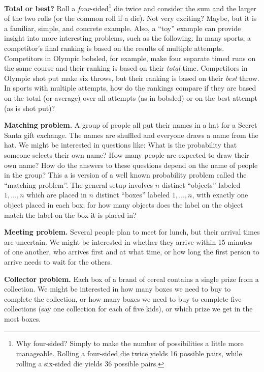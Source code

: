 \documentclass[
  letterpaper,
  DIV=11,
  numbers=noendperiod]{scrreprt}
\theoremstyle{plain}
\theoremstyle{definition}
\theoremstyle{definition}
\theoremstyle{definition}
\theoremstyle{remark}
\begin{document}
\textbf{Total or best?} Roll a \emph{four}-sided\footnote{Why
  four-sided? Simply to make the number of possibilities a little more
  manageable. Rolling a four-sided die twice yields 16 possible pairs,
  while rolling a six-sided die yields 36 possible pairs.} die twice and
consider the sum and the larger of the two rolls (or the common roll if
a die). Not very exciting? Maybe, but it is a familiar, simple, and
concrete example. Also, a ``toy'' example can provide insight into more
interesting problems, such as the following. In many sports, a
competitor's final ranking is based on the results of multiple attempts.
Competitors in Olympic bobsled, for example, make four separate timed
runs on the same course and their ranking is based on their \emph{total}
time. Competitors in Olympic shot put make six throws, but their ranking
is based on their \emph{best} throw. In sports with multiple attempts,
how do the rankings compare if they are based on the total (or average)
over all attempts (as in bobsled) or on the best attempt (as is shot
put)?

\textbf{Matching problem.} A group of people all put their names in a
hat for a Secret Santa gift exchange. The names are shuffled and
everyone draws a name from the hat. We might be interested in questions
like: What is the probability that someone selects their own name? How
many people are expected to draw their own name? How do the answers to
these questions depend on the name of people in the group? This a is
version of a well known probability problem called the ``matching
problem''. The general setup involves \(n\) distinct ``objects'' labeled
\(1, \ldots, n\) which are placed in \(n\) distinct ``boxes'' labeled
\(1, \ldots, n\), with exactly one object placed in each box; for how
many objects does the label on the object match the label on the box it
is placed in?

\textbf{Meeting problem.} Several people plan to meet for lunch, but
their arrival times are uncertain. We might be interested in whether
they arrive within 15 minutes of one another, who arrives first and at
what time, or how long the first person to arrive needs to wait for the
others.

\textbf{Collector problem.} Each box of a brand of cereal contains a
single prize from a collection. We might be interested in how many boxes
we need to buy to complete the collection, or how many boxes we need to
buy to complete five collections (say one collection for each of five
kids), or which prize we get in the most boxes.
\end{document}
